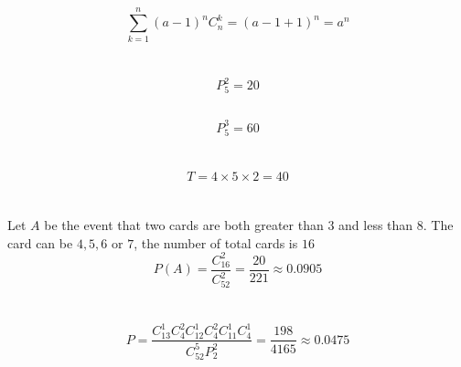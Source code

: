 \documentclass{article}
\begin{document}
        \subsection{}
                $$\sum _{k=1}^{n}(a-1)^nC_n ^k=(a-1+1)^n=a^n$$
    
    \section{}
        \subsection{}
                $$P_5 ^2 =20$$
        \subsection{}
                $$P_5 ^3=60$$
    
    \section{}
        $$T=4\times 5\times 2=40$$
    
    \section{}
        Let $A$ be the event that two cards are both greater than $3$ and less than $8$.
        The card can be $4,5,6$ or $7$, the number of total cards is $16$
        $$P(A)= \frac{C_{16} ^ 2}{C_{52} ^ 2}=\frac{20}{221}\approx 0.0905$$

    \section{}
        \subsection{}
                $$P=\frac{C_{13}^1C_4^2C_{12}^1C_4^2C_{11}^1C_4^1}{C_{52}^5P_2^2}=\frac{198}{4165} \approx 0.0475$$
        
\end{document}
